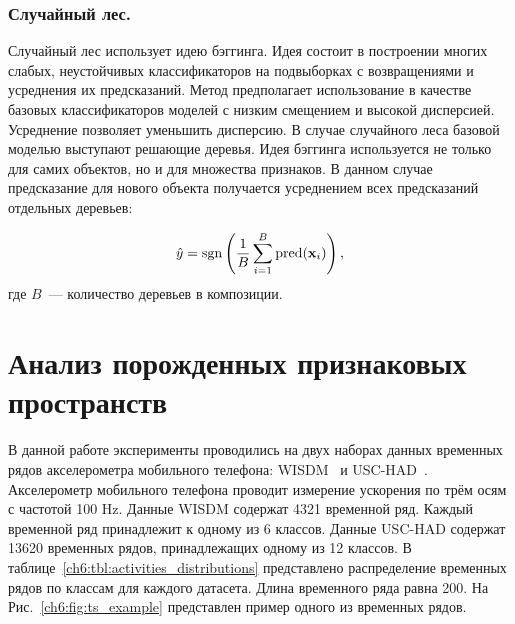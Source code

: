 \subsubsection{Случайный лес.}
Случайный лес использует идею бэггинга. 
Идея состоит в построении многих слабых, неустойчивых классификаторов на подвыборках с возвращениями и усреднения их предсказаний.
Метод предполагает использование в качестве базовых классификаторов моделей с низким смещением и высокой дисперсией. 
Усреднение позволяет уменьшить дисперсию.
В случае случайного леса базовой моделью выступают решающие деревья. Идея бэггинга используется не только для самих объектов, но и для множества признаков.
В данном случае предсказание для нового объекта получается усреднением всех предсказаний отдельных деревьев:

\begin{equation*}
	\hat{y} = \operatorname{\mathop{sgn}} \left(\frac{1}{B} \sum_{i=1}^{B} \text{pred}(\mathbf{x}_i) \right),
\end{equation*}
где $B$~--- количество деревьев в композиции.


\section{Анализ порожденных признаковых пространств}
\label{sec:ch6:exp_feature_generation}

В данной работе эксперименты проводились на двух наборах данных временных рядов акселерометра мобильного телефона: WISDM~\cite{wisdm} и USC-HAD~\cite{usc}. 
Акселерометр мобильного телефона проводит измерение ускорения по трём осям с частотой 100 Hz.
Данные WISDM содержат 4321 временной ряд.
Каждый временной ряд принадлежит к одному из 6 классов. 
Данные USC-HAD содержат 13620 временных рядов, принадлежащих одному из 12 классов.  
В таблице~\ref{ch6:tbl:activities_distributions} представлено распределение временных рядов по классам для каждого датасета.
Длина временного ряда равна 200.
На Рис.~\ref{ch6:fig:ts_example} представлен пример одного из временных рядов.


